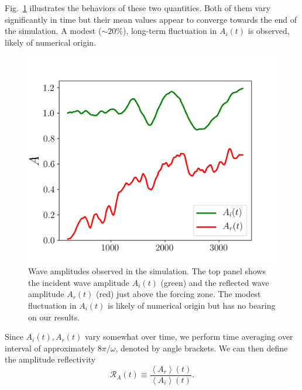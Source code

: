 \documentclass[
        fleqn,
        usenatbib,
        referee,
    ]{mnras}
\newcommand*{\ev}[1]{\left\langle#1\right\rangle}
\begin{document}
Fig.~\ref{fig:nl_f_amps} illustrates the behaviors of these two quantities. Both
of them vary significantly in time but their mean values appear to converge
towards the end of the simulation. A modest ($\sim20\%$), long-term fluctuation
in $A_i(t)$ is observed, likely of numerical origin.
\begin{figure}
    \centering
    \includegraphics[width=0.9\columnwidth]{plots/nl_f_amps.png}
    \caption{Wave amplitudes observed in the simulation. The
    top panel shows the incident wave amplitude $A_i(t)$ (green) and the
    reflected wave amplitude $A_r(t)$ (red) just above the forcing
    zone. The modest fluctuation in $A_i(t)$ is likely of numerical origin but
    has no bearing on our results.}\label{fig:nl_f_amps}
\end{figure}

Since $A_i(t), A_r(t)$ vary somewhat over time, we perform time averaging over
interval of approximately $8\pi/\omega$, denoted by angle brackets. We can then
define the amplitude reflectivity
\begin{equation}
    \mathcal{R}_A(t) \equiv \frac{\ev{A_r}(t)}{\ev{A_i}(t)}
        .\label{eq:Ra_def}
\end{equation}
\end{document}
